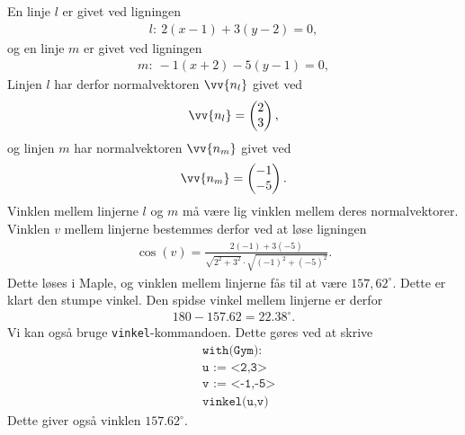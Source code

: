 \begin{exa}
	En linje $l$ er givet ved ligningen
	\begin{align*}
		l: \ 2(x-1) + 3(y-2) = 0,
	\end{align*}
	og en linje $m$ er givet ved ligningen
	\begin{align*}
		m: \ -1(x+2) -5(y-1) = 0,
	\end{align*}
	Linjen $l$ har derfor normalvektoren $\vv{n_l}$ givet ved
	\begin{align*}
		\vv{n_l} = \begin{pmatrix}
			2 \\ 3	
		\end{pmatrix},
	\end{align*}
	og linjen $m$ har normalvektoren $\vv{n_m}$ givet ved
	\begin{align*}
		\vv{n_m} = \begin{pmatrix}
			-1\\-5
		\end{pmatrix}.
	\end{align*}
	Vinklen mellem linjerne $l$ og $m$ må være lig vinklen mellem deres normalvektorer. 
	Vinklen $v$ mellem linjerne bestemmes derfor ved at løse ligningen
	\begin{align*}
		\cos(v) = \frac{2(-1)+3(-5)}{\sqrt{2^2+3^2}\cdot\sqrt{(-1)^2+(-5)^2}}. 
	\end{align*}
	Dette løses i Maple, og vinklen mellem linjerne fås til at være $157,62^{\circ}$. Dette er 
	klart den stumpe vinkel. Den spidse vinkel mellem linjerne er derfor 
	\begin{align*}
		180-157.62 = 22.38^{\circ}.
	\end{align*}
	Vi kan også bruge \texttt{vinkel}-kommandoen. Dette gøres ved at skrive
	\begin{align*}
		&\texttt{with(Gym):} \\
		&\texttt{u := <2,3>} \\
		&\texttt{v := <-1,-5>} \\
		&\texttt{vinkel(u,v)}
	\end{align*}
	Dette giver også vinklen $157.62^\circ$.
\end{exa}
